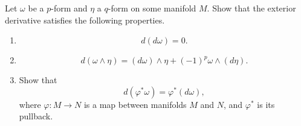 \begin{Problem}

Let $\omega$ be a $p$-form and $\eta$ a $q$-form on some manifold $M$. Show that the exterior derivative satisfies the following properties.

\begin{enumerate}
\item[(a)]
\[
d(d\omega)=0.
\]

\item[(b)]
\[
d(\omega\wedge\eta)
=
(d\omega)\wedge\eta
+
(-1)^p\omega\wedge(d\eta).
\]

\item[(c)]
Show that
\[
d(\varphi^*\omega)=\varphi^*(d\omega),
\]
where $\varphi:M\rightarrow N$ is a map between manifolds $M$ and $N$, and $\varphi^*$ is its pullback.

\end{enumerate}

\end{Problem}
